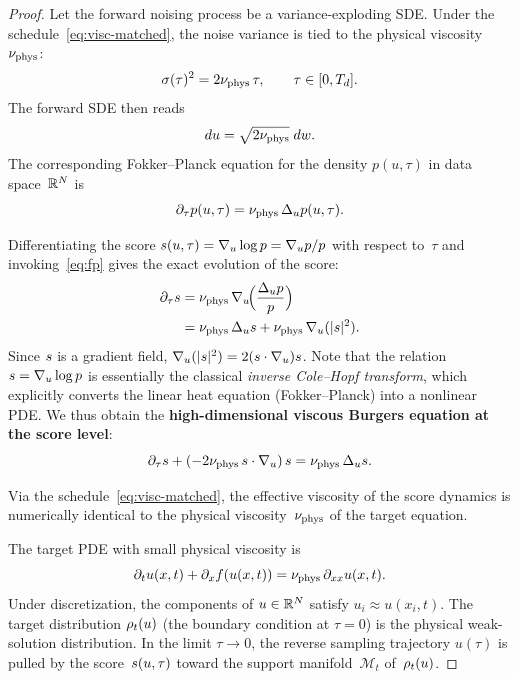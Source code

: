 \begin{proof}
Let the forward noising process be a variance-exploding SDE.
Under the schedule~\eqref{eq:visc-matched}, the noise variance is tied to the physical
viscosity~$\nu_{\mathrm{phys}}$:
\begin{equation}
\sigma(\tau)^{2} = 2\nu_{\mathrm{phys}}\,\tau, \qquad \tau \in [0,T_{d}].
\end{equation}
The forward SDE then reads
\begin{equation}
du = \sqrt{2\nu_{\mathrm{phys}}}\; dw.
\end{equation}
The corresponding Fokker--Planck equation for the density $p(u,\tau)$ in data space~$\mathbb{R}^{N}$ is
\begin{equation}
\label{eq:fp}
\partial_{\tau} p(u,\tau) = \nu_{\mathrm{phys}}\,\Delta_{u} p(u,\tau).
\end{equation}

Differentiating the score $s(u,\tau) = \nabla_u \log p = \nabla_u p / p$ with
respect to~$\tau$ and invoking~\eqref{eq:fp} gives the exact evolution of the score:
\begin{align}
\partial_{\tau} s
  &= \nu_{\mathrm{phys}}\,\nabla_u\!\Bigl( \frac{\Delta_u p}{p} \Bigr) \notag\\
  &= \nu_{\mathrm{phys}}\,\Delta_u s + \nu_{\mathrm{phys}}\,\nabla_u(\lvert s \rvert^{2}).
\end{align}
Since $s$ is a gradient field, $\nabla_u(\lvert s \rvert^{2}) = 2(s\cdot\nabla_u)s$.
Note that the relation $s = \nabla_u\log p$ is essentially the classical
\emph{inverse Cole--Hopf transform}, which explicitly converts the linear heat equation
(Fokker--Planck) into a nonlinear PDE.
We thus obtain the \textbf{high-dimensional viscous Burgers equation at the score level}:
\begin{equation}
\label{eq:score-burg}
\partial_{\tau} s + (-2\nu_{\mathrm{phys}}\,s\cdot\nabla_u)\,s = \nu_{\mathrm{phys}}\,\Delta_u s.
\end{equation}

\begin{lemma}
\label{lem:visc-equiv}
Via the schedule~\eqref{eq:visc-matched}, the effective viscosity of the score dynamics is
numerically identical to the physical viscosity~$\nu_{\mathrm{phys}}$ of the target equation.
\end{lemma}

The target PDE with small physical viscosity is
\begin{equation}
\label{eq:target-pde}
\partial_{t} u(x,t) + \partial_{x} f(u(x,t)) = \nu_{\mathrm{phys}}\,\partial_{xx} u(x,t).
\end{equation}
Under discretization, the components of $u \in \mathbb{R}^{N}$ satisfy $u_i \approx u(x_i,t)$.
The target distribution $\rho_{t}(u)$ (the boundary condition at $\tau=0$) is the physical
weak-solution distribution.
In the limit $\tau\to0$, the reverse sampling trajectory $u(\tau)$ is pulled by the
score~$s(u,\tau)$ toward the support manifold~$\mathcal{M}_{t}$ of~$\rho_{t}(u)$.


\end{proof}
